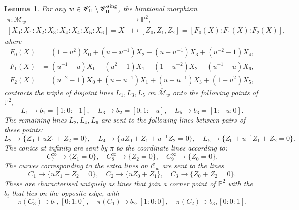 \documentclass[a4paper,reqno]{amsart}
\numberwithin{equation}{section}
\newcommand{\p}{\mathbb{P}}
\newtheorem{lemma}[theorem]{Lemma}
\numberwithin{equation}{section}
\begin{document}
\begin{lemma} 
For any $w \in \mathscr{W}_{\rm{II}}\setminus \mathscr{W}_{\rm{II}}^{\operatorname{sing}}$, the birational morphism 
\begin{equation*}
    \begin{aligned}
        \pi : \overline{\mathcal{M}}_w&\to \p^2, \\
        [X_0:X_1:X_2:X_3:X_4: X_4:X_5:X_6] = X &\mapsto [Z_0,Z_1,Z_2]=[F_0(X):F_1(X):F_2(X)],
    \end{aligned}
\end{equation*}
where 
\begin{equation*}
    \begin{aligned}
    F_0(X) &= 
    \left(1-u^2\right) X_0
    +\left(u-u^{-1}\right) X_2
    +\left(u-u^{-1}\right) X_3
    +\left(u^{-2}-1\right) X_4,\\
    F_1(X) &= 
    \left(u^{-1}-u\right) X_0
    +\left(u^2-1\right) X_1
    +\left(1-u^{-2}\right) X_2
    +\left(u^{-1}-u\right) X_6,\\
    F_2(X) &= 
    \left(u^{-2}-1\right) X_0
    +\left(u-u^{-1}\right) X_1
    +\left(u-u^{-1}\right) X_3
    +\left(1-u^2\right) X_5,
    \end{aligned}
\end{equation*}
contracts the triple of disjoint lines $L_1,L_3,L_5$ on $\overline{\mathcal{M}}_w$ onto the following points of $\p^2$, 
$$L_1 \to b_1 = [1:0:-1], \quad 
L_3 \to b_2 = [0:1:-u], \quad 
L_5 \to b_3 = [1:-u:0].$$ 
The remaining lines $L_2,L_4,L_6$ are sent to the following lines between pairs of these points:
$$L_2 \to \{Z_0+ uZ_1+Z_2=0\}, \quad 
L_4 \to \{ uZ_0+Z_1+u^{-1}Z_2=0\}, \quad 
L_6 \to \{ Z_0 + u^{-1} Z_1 + Z_2=0\}.$$
The conics at infinity are sent by $\pi$ to the coordinate lines according to:
$$C_7^{\infty} \to  \{Z_1=0\}, \quad
C_8^{\infty} \to \{Z_2 = 0\}, \quad 
C_9^{\infty} \to \{Z_0 = 0\}.$$
The curves corresponding to the extra lines on $\overline{\mathcal{C}}_w$ are sent to the lines
$$C_1 \to  \{u Z_1 + Z_2=0\}, \quad
C_2 \to \{u Z_0 + Z_1\}, \quad 
C_3 \to \{Z_0+Z_2 = 0\}.$$
These are characterised uniquely as lines that join a corner point of $\p^2$ with the $b_i$ that lies on the opposite edge, with 
$$\pi(C_3) \ni b_1,[0:1:0], \quad 
\pi(C_1) \ni b_2, [1:0:0], \quad 
\pi(C_2)\ni b_3, [0:0:1].$$
\end{lemma}
\end{document}
